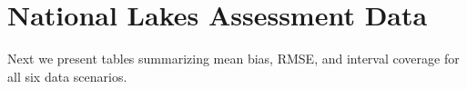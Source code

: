 \documentclass[]{elsarticle} %
\begin{document}
\begin{table}[ht]
\centering
{}
\caption{Sampling-inference combination (Approach), population layout (Layout), response type (Response), proportion of dependent random error (DRE\%), sample size (n), mean bias (MB), root-mean-squared error (RMSE), and 95\% interval coverage (Coverage) in simulation scenario 36.} 
\end{table}

\clearpage

\hypertarget{sec:datatabs}{%
\section{National Lakes Assessment Data}\label{sec:datatabs}}

Next we present tables summarizing mean bias, RMSE, and interval
coverage for all six data scenarios.
\end{document}
